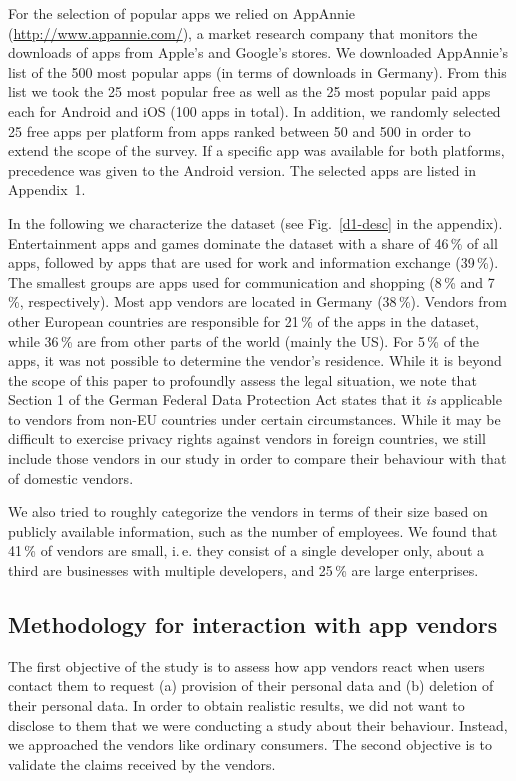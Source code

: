 \documentclass{llncs}
\begin{document}
For the selection of popular apps we relied on AppAnnie (\url{http://www.appannie.com/}), a market research company that monitors the downloads of apps from Apple's and Google's stores. We downloaded AppAnnie's list of the 500 most popular apps (in terms of downloads in Germany). From this list we took the 25 most popular free as well as the 25 most popular paid apps each for Android and iOS (100 apps in total). In addition, we randomly selected 25 free apps per platform from apps ranked between 50 and 500 in order to extend the scope of the survey. If a specific app was available for both platforms, precedence was given to the Android version. The selected apps are listed in Appendix~1.

In the following we characterize the dataset (see Fig.~\ref{d1-desc} in the appendix). Entertainment apps and games dominate the dataset with a share of 46\,\% of all apps, followed by apps that are used for work and information exchange (39\,\%). The smallest groups are apps used for communication and shopping (8\,\% and 7\,\%, respectively). Most app vendors are located in Germany (38\,\%). Vendors from other European countries are responsible for 21\,\% of the apps in the dataset, while 36\,\% are from other parts of the world (mainly the US). For 5\,\% of the apps, it was not possible to determine the vendor's residence. While it is beyond the scope of this paper to profoundly assess the legal situation, we note that Section 1 of the German Federal Data Protection Act states that it \emph{is} applicable to vendors from non-EU countries under certain circumstances. While it may be difficult  to exercise privacy rights against vendors in foreign countries, we  still include those vendors in our study in order to compare their behaviour with that of domestic vendors.

We also tried to roughly categorize the vendors in terms of their size based on publicly available information, such as the number of employees. We found that 41\,\% of vendors are small, i.\,e. they consist of a single developer only, about a third are businesses with multiple developers, and 25\,\% are large enterprises.




\subsection{Methodology for interaction with app vendors}
\label{methodology-apps}

The first objective of the study is to assess how app vendors react when users contact them to request (a) provision of their personal data and (b) deletion of their personal data. In order to obtain realistic results, we did not want to disclose to them that we were conducting a study about their behaviour. Instead, we approached the vendors like ordinary consumers. The second objective is to validate the claims received by the vendors.
\end{document}
